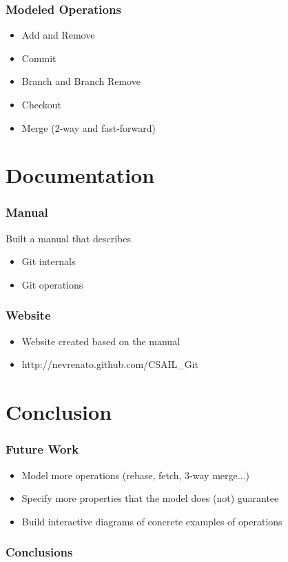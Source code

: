 \documentclass{beamer}
\begin{document}
\begin{frame}[fragile]
   \frametitle{Modeled Operations}
   \begin{itemize}
      \item Add and Remove
      \item Commit
      \item Branch and Branch Remove
      \item Checkout
      \item Merge (2-way and fast-forward)
   \end{itemize}
\end{frame}

\section{Documentation}

\begin{frame}
	\frametitle{Manual}
	\begin{block}{Built a manual that describes}
	\begin{itemize}
		\item Git internals
		\item Git operations
	\end{itemize}
	\end{block}
\end{frame}

\begin{frame}
	\frametitle{Website}
	\begin{itemize}
	\item Website created based on the manual 
	\item http://nevrenato.github.com/CSAIL\_Git
	\end{itemize}

\end{frame}

\section{Conclusion}

\begin{frame}
	\frametitle{Future Work}
	\begin{itemize}
	\item Model more operations (rebase, fetch, 3-way merge...) 
	\item Specify more properties that the model does (not) guarantee
	\item Build interactive diagrams of concrete examples of operations 
	\end{itemize}
\end{frame}

\begin{frame}
	\frametitle{Conclusions}
\end{frame}
\end{document}
